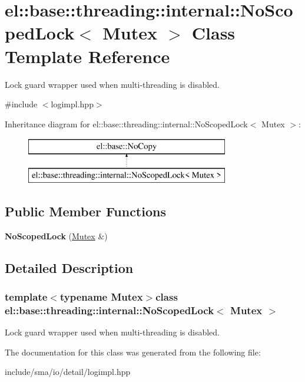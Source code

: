 \hypertarget{classel_1_1base_1_1threading_1_1internal_1_1NoScopedLock}{\section{el\-:\-:base\-:\-:threading\-:\-:internal\-:\-:No\-Scoped\-Lock$<$ Mutex $>$ Class Template Reference}
\label{classel_1_1base_1_1threading_1_1internal_1_1NoScopedLock}
}


Lock guard wrapper used when multi-\/threading is disabled.  




{\ttfamily \#include $<$logimpl.\-hpp$>$}

Inheritance diagram for el\-:\-:base\-:\-:threading\-:\-:internal\-:\-:No\-Scoped\-Lock$<$ Mutex $>$\-:\begin{figure}[H]
\begin{center}
\leavevmode
\includegraphics[height=2.000000cm]{classel_1_1base_1_1threading_1_1internal_1_1NoScopedLock}
\end{center}
\end{figure}
\subsection*{Public Member Functions}
\begin{DoxyCompactItemize}
\item 
\hypertarget{classel_1_1base_1_1threading_1_1internal_1_1NoScopedLock_a020f8cea6e83f40ea29662ef57a58235}{{\bfseries No\-Scoped\-Lock} (\hyperlink{classel_1_1base_1_1threading_1_1internal_1_1NoMutex}{Mutex} \&)}\label{classel_1_1base_1_1threading_1_1internal_1_1NoScopedLock_a020f8cea6e83f40ea29662ef57a58235}

\end{DoxyCompactItemize}


\subsection{Detailed Description}
\subsubsection*{template$<$typename Mutex$>$class el\-::base\-::threading\-::internal\-::\-No\-Scoped\-Lock$<$ Mutex $>$}

Lock guard wrapper used when multi-\/threading is disabled. 

The documentation for this class was generated from the following file\-:\begin{DoxyCompactItemize}
\item 
include/sma/io/detail/logimpl.\-hpp\end{DoxyCompactItemize}
